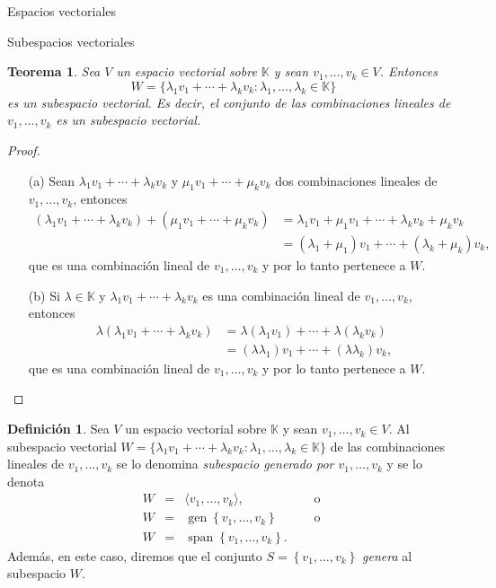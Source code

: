 \documentclass[a4paper,12pt,twoside,spanish,reqno]{amsbook}
\newtheorem{teorema}{Teorema}[section]
\theoremstyle{definition}
\newtheorem{definicion}{Definici\'on}[section]
\theoremstyle{remark}
\newcommand{\K}{\mathbb K}
\begin{document}
\begin{chapter}{Espacios vectoriales}
\begin{section}{Subespacios vectoriales}
	\begin{teorema}
	Sea $V$ un espacio vectorial sobre $\K$ y sean $v_1,\ldots,v_k \in V$. Entonces
	$$
	W = \{\lambda_1v_1+\cdots+\lambda_kv_k: \lambda_1,\ldots,\lambda_k \in \K \}
	$$
	es un subespacio vectorial. Es decir,  el conjunto de las combinaciones lineales de $v_1,\ldots,v_k$ es un subespacio vectorial.
	\end{teorema}
	\begin{proof}
		\begin{enumerate}
			\item[(a)] Sean $\lambda_1v_1+\cdots+\lambda_kv_k$ y $\mu_1v_1+\cdots+\mu_kv_k$ dos combinaciones lineales de $v_1,\ldots,v_k$, entonces 
			\begin{align*}
				(\lambda_1v_1+\cdots+\lambda_kv_k)+(\mu_1v_1+\cdots+\mu_kv_k) &=  \lambda_1v_1+\mu_1v_1+\cdots+\lambda_kv_k+\mu_kv_k\\
				&= (\lambda_1+\mu_1)v_1+\cdots+(\lambda_k+\mu_k)v_k,
			\end{align*}
			que es  una combinación lineal de  $v_1,\ldots,v_k$ y por lo tanto pertenece a $W$.
			\item[(b)] Si $\lambda \in \K$ y $\lambda_1v_1+\cdots+\lambda_kv_k$  es una combinación lineal de $v_1,\ldots,v_k$,  entonces
			\begin{align*}
			\lambda (\lambda_1v_1+\cdots+\lambda_kv_k) &=  \lambda(\lambda_1v_1)+\cdots+\lambda(\lambda_kv_k)\\
			&= (\lambda\lambda_1)v_1+\cdots+(\lambda\lambda_k)v_k,
			\end{align*}
				que es  una combinación lineal de  $v_1,\ldots,v_k$ y por lo tanto pertenece a $W$.
		\end{enumerate}
	\end{proof}
	


	\begin{definicion}
	Sea $V$ un espacio vectorial sobre $\K$ y sean $v_1,\ldots,v_k \in V$. Al  subespacio vectorial $	W = \{\lambda_1v_1+\cdots+\lambda_kv_k: \lambda_1,\ldots,\lambda_k \in \K \}$ de las combinaciones lineales de $v_1,\ldots,v_k$ se lo denomina \textit{subespacio generado por $v_1,\ldots,v_k$} y se lo denota  
	\begin{equation*}
		\begin{array}{rcll}
		W &=& \langle v_1,\ldots,v_k \rangle, &\quad \text{ o } \\
		W &=&  \operatorname{gen}\left\{ v_1,\ldots,v_k\right\} &\quad \text{ o } \\
		W &=&  \operatorname{span}\left\{ v_1,\ldots,v_k\right\}.&
		\end{array}
	\end{equation*}
	Además, en este caso, diremos que el conjunto $S = \left\{ v_1,\ldots,v_k \right\}$ \textit{genera} al subespacio $W$.
	

\end{definicion}
\end{section}
\end{chapter}
\end{document}
